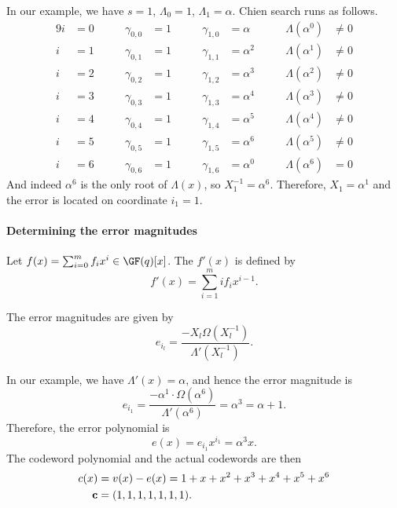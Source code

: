 \documentclass[a4paper, 11pt, openany]{book}
\begin{document}
In our example, we have $s=1$, $\Lambda_0 = 1$, $\Lambda_1 = \alpha$. Chien search runs as follows.
\begin{alignat*}{9}
    i&=0 &\qquad \gamma_{0,0} &= 1   &\qquad    \gamma_{1,0} &= \alpha      &\qquad   \Lambda(\alpha^0) &\ne 0\\
    i&=1 &\qquad \gamma_{0,1} &= 1   &\qquad    \gamma_{1,1} &= \alpha^2    &\qquad    \Lambda(\alpha^1) &\ne 0\\
    i&=2 &\qquad \gamma_{0,2} &= 1   &\qquad    \gamma_{1,2} &= \alpha^3    &\qquad    \Lambda(\alpha^2) &\ne 0\\
    i&=3 &\qquad \gamma_{0,3} &= 1   &\qquad    \gamma_{1,3} &= \alpha^4    &\qquad    \Lambda(\alpha^3) &\ne 0\\
    i&=4 &\qquad \gamma_{0,4} &= 1   &\qquad    \gamma_{1,4} &= \alpha^5    &\qquad    \Lambda(\alpha^4) &\ne 0\\
    i&=5 &\qquad \gamma_{0,5} &= 1   &\qquad    \gamma_{1,5} &= \alpha^6    &\qquad    \Lambda(\alpha^5) &\ne 0\\
    i&=6 &\qquad \gamma_{0,6} &= 1   &\qquad    \gamma_{1,6} &= \alpha^0    &\qquad    \Lambda(\alpha^6) &= 0
\end{alignat*}
And indeed $\alpha^6$ is the only root of $\Lambda(x)$, so $X_1^{-1} = \alpha^6$. Therefore,  $X_1 = \alpha^1$ and the error is located on coordinate $i_1 = 1$.

\paragraph{Determining the error magnitudes}
Let $f(x) = \sum_{i=0}^m f_i x^i \in \GF(q)[x]$. The  $f'(x)$ is defined by
$$
	f'(x) = \sum_{i=1}^m i f_i x^{i-1}.
$$

\begin{theorem}
The error magnitudes are given by
$$
	e_{i_l} = \frac{- X_l \Omega(X_l^{-1})} {\Lambda'(X_l^{-1})}.
$$
\end{theorem}

In our example, we have $\Lambda'(x) = \alpha$, and hence the error magnitude is
\[
    e_{i_1} = \frac{- \alpha^1 \cdot \Omega(\alpha^6)}{\Lambda'(\alpha^6)} = \alpha^3 = \alpha + 1.
\]
Therefore, the error polynomial is
\[
    e(x) = e_{i_1} x^{i_1} = \alpha^3 x.
\]
The codeword polynomial and the actual codewords are then
\begin{align*}
    c(x) &= v(x) - e(x) = 1 + x + x^2 + x^3 + x^4 + x^5 + x^6\\
    {\bf c} &= (1,1,1,1,1,1,1).
\end{align*}
\end{document}
